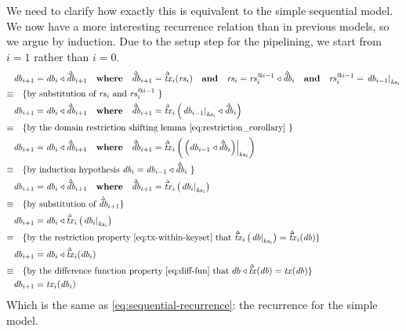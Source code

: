\documentclass[11pt,a4paper]{article}
\newcommand\restrict[2]{\left.#1\right|_{#2}}
\newcommand\deltavar[1]{\accentset{\Delta}{#1}}
\begin{document}
We need to clarify how exactly this is equivalent to the simple sequential
model. We now have a more interesting recurrence relation than in previous
models, so we argue by induction. Due to the setup step for the pipelining, we
start from $i=1$ rather than $i=0$.
\begin{align*}
       & \mathit{db}_{i+1} = \mathit{db}_i \triangleleft \deltavar{\mathit{db}}_{i+1}
         \quad \mathbf{where} \quad \deltavar{\mathit{db}}_{i+1} = \deltavar{\mathit{tx}}_i(\mathit{rs}_i)
         \quad \mathbf{and} \quad \mathit{rs}_i = \mathit{rs}^{@{i-1}}_i \triangleleft \deltavar{\mathit{db}}_i
         \quad \mathbf{and} \quad \mathit{rs}^{@i-1}_i = \restrict{\mathit{db}_{i-1}}{\mathit{ks}_i}
      \\
\equiv & \quad \text{\{by substitution of $\mathit{rs}_i$ and $\mathit{rs}^{@i-1}_i$ \}}
      \\
       & \mathit{db}_{i+1} = \mathit{db}_i \triangleleft \deltavar{\mathit{db}}_{i+1}
         \quad \mathbf{where} \quad \deltavar{\mathit{db}}_{i+1} = \deltavar{\mathit{tx}}_i\left(\restrict{\mathit{db}_{i-1}}{\mathit{ks}_i} \triangleleft \deltavar{\mathit{db}}_{i}\right)
      \\
\equiv & \quad \text{\{by the domain restriction shifting lemma \cref{eq:restriction_corollary} \}}
      \\
       & \mathit{db}_{i+1} = \mathit{db}_i \triangleleft \deltavar{\mathit{db}}_{i+1}
         \quad \mathbf{where} \quad \deltavar{\mathit{db}}_{i+1} = \deltavar{\mathit{tx}}_i\left(\restrict{\left(\mathit{db}_{i-1} \triangleleft \deltavar{\mathit{db}}_{i}\right)}{\mathit{ks}_i}\right)
      \\
\equiv & \quad \text{\{by induction hypothesis $\mathit{db}_i = \mathit{db}_{i-1} \triangleleft \deltavar{\mathit{db}}_{i}$ \}}
      \\
       & \mathit{db}_{i+1} = \mathit{db}_i \triangleleft \deltavar{\mathit{db}}_{i+1}
         \quad \mathbf{where} \quad \deltavar{\mathit{db}}_{i+1} = \deltavar{\mathit{tx}}_i\left(\restrict{\mathit{db}_i}{\mathit{ks}_i}\right)
      \\
\equiv & \quad \text{\{by substitution of $\deltavar{\mathit{db}}_{i+1}$\}}
      \\
       & \mathit{db}_{i+1} = \mathit{db}_i \triangleleft \deltavar{\mathit{tx}}_i\left(\restrict{\mathit{db}_i}{\mathit{ks}_i}\right)
      \\
\equiv & \quad \text{\{by the restriction property \cref{eq:tx-within-keyset} that
                     $\deltavar{\mathit{tx}}_i\left(\restrict{\mathit{db}}{\mathit{ks}_i}\right) = \deltavar{\mathit{tx}}_i(\mathit{db})$\}}
      \\
       & \mathit{db}_{i+1} = \mathit{db}_i \triangleleft \deltavar{\mathit{tx}}_i(\mathit{db}_i)
      \\
\equiv & \quad \text{\{by the difference function property \cref{eq:diff-fun} that
                     $db \triangleleft \deltavar{\mathit{tx}}(\mathit{db}) = \mathit{tx}(\mathit{db})$\}}
      \\
       & \mathit{db}_{i+1} = \mathit{tx}_i(\mathit{db}_i)
\end{align*}
Which is the same as \cref{eq:sequential-recurrence}: the recurrence for the simple model.
\end{document}

